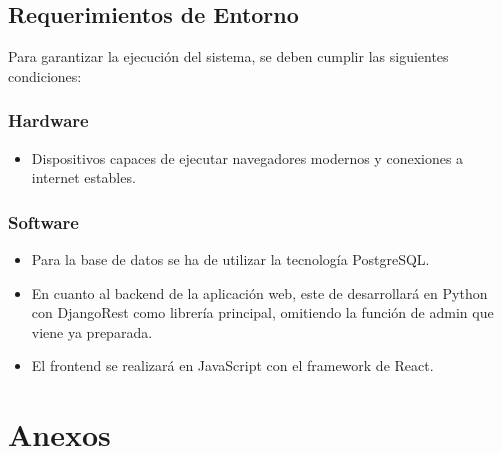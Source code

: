 \documentclass{report}
\begin{document}
        \vspace{1cm}

        \subsection*{Requerimientos de Entorno}

            Para garantizar la ejecución del sistema, se deben cumplir las siguientes condiciones:

            \subsubsection{Hardware}
            \begin{itemize}
                \item Dispositivos capaces de ejecutar navegadores modernos y conexiones a internet estables.
            \end{itemize}
            
            \subsubsection{Software}
            \begin{itemize}
                \item Para la base de datos se ha de utilizar la tecnología PostgreSQL.
                \item En cuanto al backend de la aplicación web, este de desarrollará en Python con DjangoRest como 
                librería principal, omitiendo la función de admin que viene ya preparada.
                \item El frontend se realizará en JavaScript con el framework de React.
            \end{itemize}

    \newpage

    \section*{Anexos}
\end{document}
